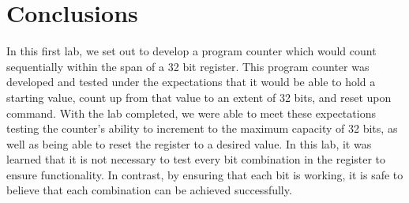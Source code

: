 \documentclass{article}
\begin{document}
\section{Conclusions}
In this first lab, we set out to develop a program counter which would count sequentially within the span of a 32 bit register. This program counter was developed and tested under the expectations that it would be able to hold a starting value, count up from that value to an extent of 32 bits, and reset upon command. With the lab completed, we were able to meet these expectations testing the counter's ability to increment to the maximum capacity of 32 bits, as well as being able to reset the register to a desired value. In this lab, it was learned that it is not necessary to test every bit combination in the register to ensure functionality. In contrast, by ensuring that each bit is working, it is safe to believe that each combination can be achieved successfully.
\end{document}
